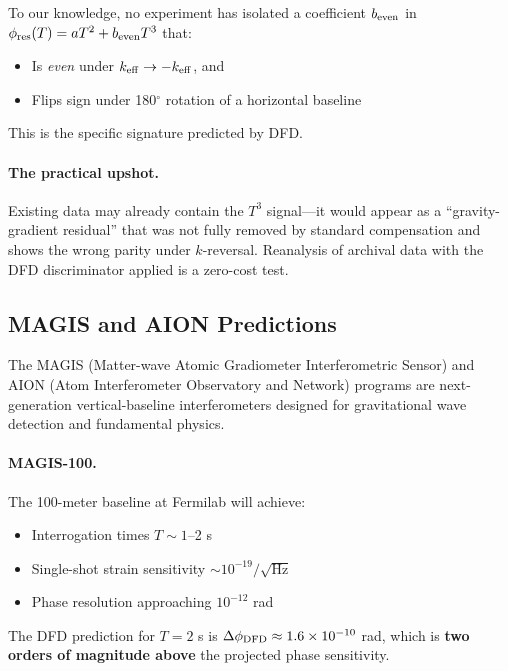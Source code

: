 To our knowledge, no experiment has isolated a coefficient $b_{\rm even}$ in 
$\phi_{\rm res}(T) = aT^2 + b_{\rm even}T^3$ that:
\begin{itemize}
\item[(a)] Is \textit{even} under $k_{\rm eff} \to -k_{\rm eff}$, and
\item[(b)] Flips sign under 180$^\circ$ rotation of a horizontal baseline
\end{itemize}
This is the specific signature predicted by DFD.

\paragraph{The practical upshot.}
Existing data may already contain the $T^3$ signal---it would appear as a 
``gravity-gradient residual'' that was not fully removed by standard compensation 
and shows the wrong parity under $k$-reversal. Reanalysis of archival data with 
the DFD discriminator applied is a zero-cost test.

\subsection{MAGIS and AION Predictions}\label{sec:mw-magis}

The MAGIS (Matter-wave Atomic Gradiometer Interferometric Sensor) and AION 
(Atom Interferometer Observatory and Network) programs are next-generation 
vertical-baseline interferometers designed for gravitational wave detection 
and fundamental physics.

\paragraph{MAGIS-100.}
The 100-meter baseline at Fermilab will achieve:
\begin{itemize}
\item Interrogation times $T \sim 1$--2 s
\item Single-shot strain sensitivity $\sim 10^{-19}/\sqrt{\text{Hz}}$
\item Phase resolution approaching $10^{-12}$ rad
\end{itemize}
The DFD prediction for $T = 2$ s is $\Delta\phi_{\rm DFD} \approx 1.6 \times 10^{-10}$ rad, 
which is \textbf{two orders of magnitude above} the projected phase sensitivity.

